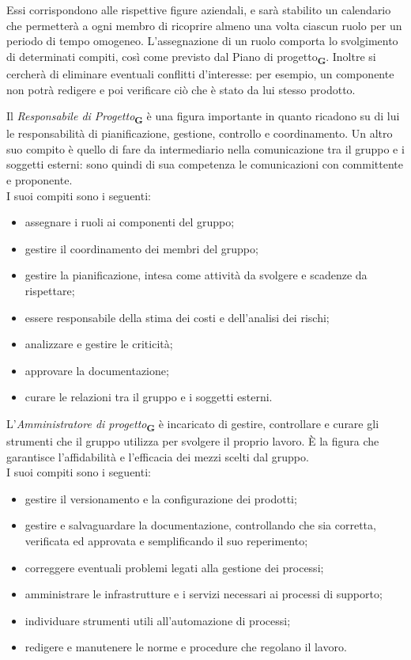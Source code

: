 Essi corrispondono alle rispettive figure aziendali, e sarà stabilito un calendario che permetterà a ogni membro di ricoprire almeno una volta ciascun ruolo per un periodo di tempo omogeneo. L'assegnazione di un ruolo comporta lo svolgimento di determinati compiti, così come previsto dal Piano di progetto\textsubscript{\textbf{G}}. Inoltre si cercherà di eliminare eventuali conflitti d'interesse: per esempio, un componente non potrà redigere e poi verificare ciò che è stato da lui stesso prodotto.

Il \textit{Responsabile di Progetto}\textsubscript{\textbf{G}} è una figura importante in quanto ricadono su di lui le responsabilità di pianificazione, gestione, controllo e coordinamento. Un altro suo compito è quello di fare da intermediario nella comunicazione tra il gruppo e i soggetti esterni: sono quindi di sua competenza le comunicazioni con committente e proponente.\\
I suoi compiti sono i seguenti:
\begin {itemize}

\item assegnare i ruoli ai componenti del gruppo;
\item gestire il coordinamento dei membri del gruppo;
\item gestire la pianificazione, intesa come attività da svolgere e scadenze da rispettare;
\item essere responsabile della stima dei costi e dell’analisi dei rischi;
\item analizzare e gestire le criticità;
\item approvare la documentazione;
\item curare le relazioni tra il gruppo e i soggetti esterni.

\end {itemize}
L’\textit{Amministratore di progetto}\textsubscript{\textbf{G}} è incaricato di gestire, controllare e curare gli strumenti che il gruppo utilizza per svolgere il proprio lavoro. È la figura che garantisce l'affidabilità e l'efficacia dei mezzi scelti dal gruppo.\\
I suoi compiti sono i seguenti:
\begin {itemize}

\item gestire il versionamento e la configurazione dei prodotti;
\item gestire e salvaguardare la documentazione, controllando che sia corretta, verificata ed approvata e semplificando il suo reperimento;
\item correggere eventuali problemi legati alla gestione dei processi;
\item amministrare le infrastrutture e i servizi necessari ai processi di supporto;
\item individuare strumenti utili all'automazione di processi;
\item redigere e manutenere le norme e procedure che regolano il lavoro.

\end {itemize}
